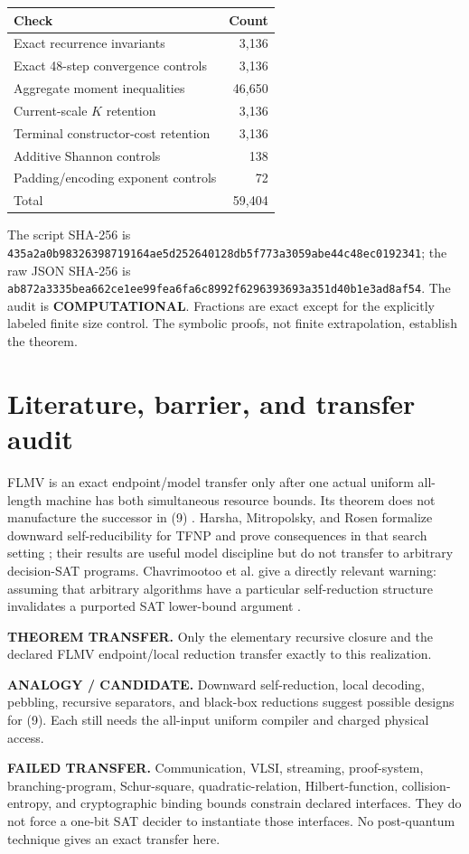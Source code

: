 \documentclass[11pt]{article}
\newcommand{\COMP}{\textbf{COMPUTATIONAL}}
\begin{document}
\begin{center}
\begin{tabular}{lr}
\toprule
Check & Count\\
\midrule
Exact recurrence invariants & 3,136\\
Exact 48-step convergence controls & 3,136\\
Aggregate moment inequalities & 46,650\\
Current-scale $K$ retention & 3,136\\
Terminal constructor-cost retention & 3,136\\
Additive Shannon controls & 138\\
Padding/encoding exponent controls & 72\\
\midrule
Total & 59,404\\
\bottomrule
\end{tabular}
\end{center}

The script SHA-256 is
\nolinkurl{435a2a0b98326398719164ae5d252640128db5f773a3059abe44c48ec0192341};
the raw JSON SHA-256 is
\nolinkurl{ab872a3335bea662ce1ee99fea6fa6c8992f6296393693a351d40b1e3ad8af54}.
The audit is \COMP.  Fractions are exact except for the explicitly labeled
finite size control.  The symbolic proofs, not finite extrapolation, establish
the theorem.

\section{Literature, barrier, and transfer audit}

FLMV is an exact endpoint/model transfer only after one actual uniform
all-length machine has both simultaneous resource bounds.  Its theorem does
not manufacture the successor in (9) \cite{flmv}.  Harsha, Mitropolsky, and
Rosen formalize downward self-reducibility for TFNP and prove consequences in
that search setting \cite{hmr}; their results are useful model discipline but
do not transfer to arbitrary decision-SAT programs.  Chavrimootoo et al. give
a directly relevant warning: assuming that arbitrary algorithms have a
particular self-reduction structure invalidates a purported SAT lower-bound
argument \cite{chkln}.

\begin{description}[leftmargin=0cm,labelwidth=0cm]
\item[] \textbf{THEOREM TRANSFER.}
Only the elementary recursive closure and the declared FLMV endpoint/local
reduction transfer exactly to this realization.
\item[] \textbf{ANALOGY / CANDIDATE.}
Downward self-reduction, local decoding, pebbling, recursive separators, and
black-box reductions suggest possible designs for (9).  Each still needs the
all-input uniform compiler and charged physical access.
\item[] \textbf{FAILED TRANSFER.}
Communication, VLSI, streaming, proof-system, branching-program, Schur-square,
quadratic-relation, Hilbert-function, collision-entropy, and cryptographic
binding bounds constrain declared interfaces.  They do not force a one-bit
SAT decider to instantiate those interfaces.  No post-quantum technique gives
an exact transfer here.
\end{description}
\end{document}
